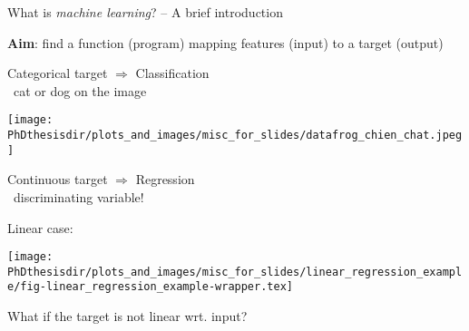 \begin{frame}{What is \emph{machine learning}? -- A brief introduction}

\begin{center}
\textbf{Aim}: find a function (program) mapping features (input) to a target (output)
\end{center}

\pause
\begin{minipage}[t]{.45\textwidth}
\manip Categorical target $\Rightarrow$ Classification\\
\qquad\eg\ cat or dog on the image
\begin{center}
\texttt{[image: \\PhDthesisdir/plots\_and\_images/misc\_for\_slides/datafrog\_chien\_chat.jpeg]}
\end{center}


\end{minipage}
\hfill\pause
\begin{minipage}[t]{.45\textwidth}
\manip Continuous target $\Rightarrow$ Regression\\
\qquad\eg\ discriminating variable!

Linear case:
\begin{center}
\texttt{[image: \\PhDthesisdir/plots\_and\_images/misc\_for\_slides/linear\_regression\_example/fig-linear\_regression\_example-wrapper.tex]}
\end{center}

What if the target is not linear wrt. input?
\end{minipage}

\end{frame}